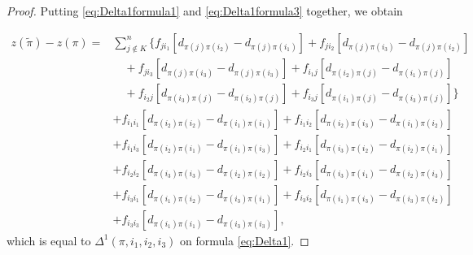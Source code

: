 \begin{proof}
	Putting \eqref{eq:Delta1formula1} and \eqref{eq:Delta1formula3} together, we obtain
	
	\[
	\begin{split}
	z(\tilde{\pi})-z(\pi)=& 
	\sum_{j\notin K}^n\Big\{
	f_{ji_1}\left[d_{\pi(j){\pi}(i_2)}-d_{\pi(j)\pi(i_1)}\right]
	+
	f_{ji_2}\left[d_{\pi(j){\pi}(i_3)}-d_{\pi(j)\pi(i_2)}\right]\\
	&\quad 
	+
	f_{ji_3}\left[d_{\pi(j){\pi}(i_3)}-d_{\pi(j)\pi(i_3)}\right]+f_{i_1j}\left[d_{\pi(i_2){\pi}(j)}-d_{\pi(i_1)\pi(j)}\right]\\
	&\quad +
	f_{i_2j}\left[d_{\pi(i_3){\pi}(j)}-d_{\pi(i_2)\pi(j)}\right]+f_{i_3j}\left[d_{\pi(i_1){\pi}(j)}-d_{\pi(i_3)\pi(j)}\right]\Big\}\\
	&+
	f_{i_1i_1}\left[d_{\pi(i_2){\pi}(i_2)}-d_{\pi(i_1)\pi(i_1)}\right]+ f_{i_1i_2}\left[d_{\pi(i_2){\pi}(i_3)}-d_{\pi(i_1)\pi(i_2)}\right] \\ &+f_{i_1i_3}\left[d_{\pi(i_2){\pi}(i_1)}-d_{\pi(i_1)\pi(i_3)}\right]+
	f_{i_2i_1}\left[d_{\pi(i_3){\pi}(i_2)}-d_{\pi(i_2)\pi(i_1)}\right]\\ &+f_{i_2i_2}\left[d_{\pi(i_3){\pi}(i_3)}-d_{\pi(i_2)\pi(i_2)}\right] + f_{i_2i_3}\left[d_{\pi(i_3){\pi}(i_1)}-d_{\pi(i_2)\pi(i_3)}\right]\\
	&+f_{i_3i_1}\left[d_{\pi(i_1){\pi}(i_2)}-d_{\pi(i_3)\pi(i_1)}\right] + f_{i_3i_2}\left[d_{\pi(i_1){\pi}(i_3)}-d_{\pi(i_3)\pi(i_2)}\right]\\ &+f_{i_3i_3}\left[d_{\pi(i_1){\pi}(i_1)}-d_{\pi(i_3)\pi(i_3)}\right],
	\end{split}
	\]
	\noindent which is equal to $\Delta^1(\pi,i_1,i_2,i_3)$ on formula \eqref{eq:Delta1}.
\end{proof}
